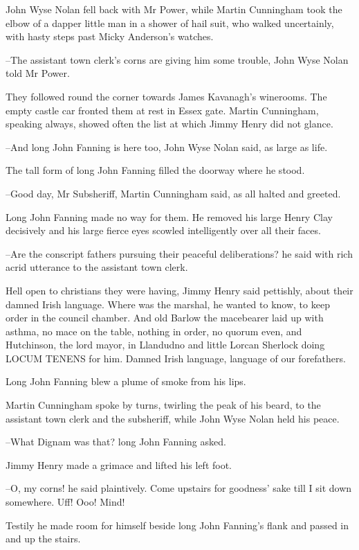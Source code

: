 John Wyse Nolan fell back with Mr Power,
while Martin Cunningham took the
elbow of a dapper little man in a shower of hail suit,
who walked
uncertainly,
with hasty steps past Micky Anderson's watches.

--The assistant town clerk's corns are giving him some trouble,
John Wyse Nolan told Mr Power.%

They followed round the corner
towards James Kavanagh's winerooms.
The
empty castle car fronted them at rest in Essex gate.
Martin Cunningham,
speaking always,
showed often the list at which Jimmy Henry did not
glance.

--And long John Fanning is here too,
John Wyse Nolan said,
as large as
life.

The tall form of long John Fanning
filled the doorway where he stood.

--Good day, Mr Subsheriff,
Martin Cunningham said,
as all halted and greeted.%

Long John Fanning made no way for them.
He removed his large Henry Clay decisively
and his large fierce eyes scowled intelligently over all their faces.

--Are the conscript fathers pursuing their peaceful deliberations?
he said with rich acrid utterance
to the assistant town clerk.

Hell open to christians they were having,
Jimmy Henry said pettishly,
about their damned Irish language.
Where was the marshal,
he wanted to
know,
to keep order in the council chamber.
And old Barlow the macebearer
laid up with asthma,
no mace on the table,
nothing in order,
no quorum even,
and Hutchinson, the lord mayor, in Llandudno
and little Lorcan
Sherlock doing LOCUM TENENS for him.
Damned Irish language,
language of
our forefathers.

Long John Fanning blew a plume of smoke from his lips.

Martin Cunningham spoke by turns,
twirling the peak of his beard,
to the
assistant town clerk and the subsheriff,
while John Wyse Nolan held his
peace.

--What Dignam was that?
long John Fanning asked.

Jimmy Henry made a grimace and lifted his left foot.

--O, my corns!
he said plaintively.
Come upstairs for goodness' sake till I sit down somewhere.
Uff!
Ooo!
Mind!

Testily he made room for himself
beside long John Fanning's flank
and
passed in and up the stairs.

